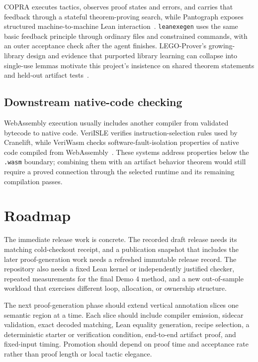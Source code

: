 \documentclass[11pt]{article}
\newcommand{\leanexegen}{\texttt{leanexegen}}
\newcommand{\code}[1]{\texttt{#1}}
\begin{document}
COPRA executes tactics, observes proof states and errors, and carries that feedback through a stateful theorem-proving search, while Pantograph exposes structured machine-to-machine Lean interaction~\cite{Thakur2024COPRA,Aniva2025Pantograph}.  \leanexegen{} uses the same basic feedback principle through ordinary files and constrained commands, with an outer acceptance check after the agent finishes.  LEGO-Prover's growing-library design and evidence that purported library learning can collapse into single-use lemmas motivate this project's insistence on shared theorem statements and held-out artifact tests~\cite{Wang2024LEGOProver,BerlotAttwell2024LibraryLearning}.

\subsection{Downstream native-code checking}

WebAssembly execution usually includes another compiler from validated bytecode to native code.  VeriISLE verifies instruction-selection rules used by Cranelift, while VeriWasm checks software-fault-isolation properties of native code compiled from WebAssembly~\cite{VanHattum2024VeriISLE,Johnson2021VeriWasm}.  These systems address properties below the \code{.wasm} boundary; combining them with an artifact behavior theorem would still require a proved connection through the selected runtime and its remaining compilation passes.

\section{Roadmap}

The immediate release work is concrete.  The recorded draft release needs its matching cold-checkout receipt, and a publication snapshot that includes the later proof-generation work needs a refreshed immutable release record.  The repository also needs a fixed Lean kernel or independently justified checker, repeated measurements for the final Demo 4 method, and a new out-of-sample workload that exercises different loop, allocation, or ownership structure.

The next proof-generation phase should extend vertical annotation slices one semantic region at a time.  Each slice should include compiler emission, sidecar validation, exact decoded matching, Lean equality generation, recipe selection, a deterministic starter or verification condition, end-to-end artifact proof, and fixed-input timing.  Promotion should depend on proof time and acceptance rate rather than proof length or local tactic elegance.
\end{document}
